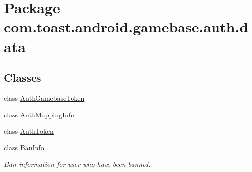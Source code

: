 \hypertarget{namespacecom_1_1toast_1_1android_1_1gamebase_1_1auth_1_1data}{}\section{Package com.\+toast.\+android.\+gamebase.\+auth.\+data}
\label{namespacecom_1_1toast_1_1android_1_1gamebase_1_1auth_1_1data}
\subsection*{Classes}
\begin{DoxyCompactItemize}
\item 
class \hyperlink{classcom_1_1toast_1_1android_1_1gamebase_1_1auth_1_1data_1_1_auth_gamebase_token}{Auth\+Gamebase\+Token}
\item 
class \hyperlink{classcom_1_1toast_1_1android_1_1gamebase_1_1auth_1_1data_1_1_auth_mapping_info}{Auth\+Mapping\+Info}
\item 
class \hyperlink{classcom_1_1toast_1_1android_1_1gamebase_1_1auth_1_1data_1_1_auth_token}{Auth\+Token}
\item 
class \hyperlink{classcom_1_1toast_1_1android_1_1gamebase_1_1auth_1_1data_1_1_ban_info}{Ban\+Info}
\begin{DoxyCompactList}\small\item\em Ban information for user who have been banned. \end{DoxyCompactList}\end{DoxyCompactItemize}
